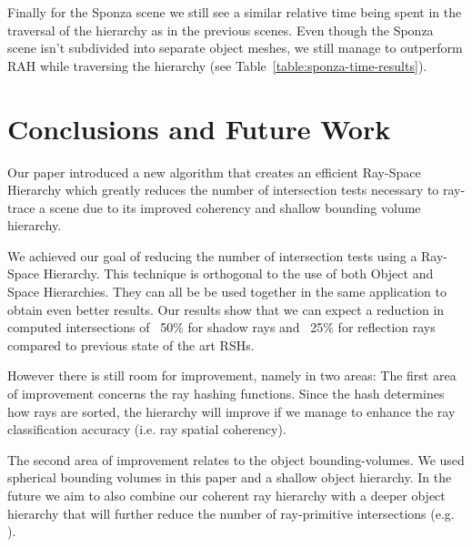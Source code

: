 \documentclass{egpubl}
\begin{document}
Finally for the Sponza scene we still see a similar relative time being spent in the traversal of the hierarchy as in the previous scenes. Even though the Sponza scene isn't subdivided into separate object meshes, we still manage to outperform RAH while traversing the hierarchy (see Table~\ref{table:sponza-time-results}). 


\section{Conclusions and Future Work}

Our paper introduced a new algorithm that creates an efficient Ray-Space Hierarchy which greatly reduces the number of intersection tests necessary to ray-trace a scene due to its improved coherency and shallow bounding volume hierarchy.

We achieved our goal of reducing the number of intersection tests using a Ray-Space Hierarchy. This technique is orthogonal to the use of both Object and Space Hierarchies. They can all be be used together in the same application to obtain even better results.
Our results show that we can expect a reduction in computed intersections of ~50\% for shadow rays and ~25\% for reflection rays compared to previous state of the art RSHs.

However there is still room for improvement, namely in two areas: The first area of improvement concerns the ray hashing functions. Since the hash determines how rays are sorted, the hierarchy will improve if we manage to enhance the ray classification accuracy (i.e. ray spatial coherency).

The second area of improvement relates to the object bounding-volumes. We used spherical bounding volumes in this paper and a shallow object hierarchy. In the future we aim to also combine our coherent ray hierarchy with a deeper object hierarchy that will further reduce the number of ray-primitive intersections (e.g. \cite{Bradshaw04}).






\nocite{*}

\vfill

\pagebreak 
\end{document}
